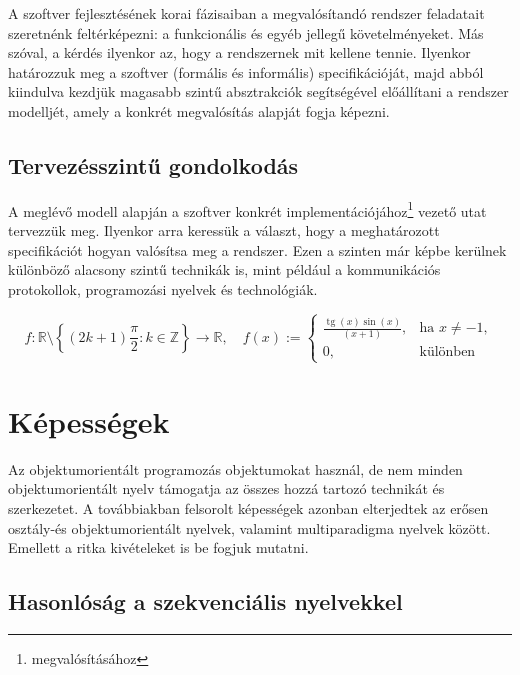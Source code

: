 \documentclass[a4paper,12pt,twoside]{report}
\theoremstyle{definition}
\DeclareMathOperator{\tg}{tg}
\begin{document}
	A szoftver fejlesztésének korai fázisaiban a megvalósítandó rendszer feladatait szeretnénk feltérképezni: a funkcionális és egyéb jellegű követelményeket. Más szóval, a kérdés ilyenkor az, hogy a rendszernek mit kellene tennie. Ilyenkor határozzuk meg a szoftver (formális és informális) specifikációját, majd abból kiindulva kezdjük magasabb szintű absztrakciók segítségével előállítani a rendszer modelljét, amely a konkrét megvalósítás alapját fogja képezni.
	
	\section{Tervezésszintű gondolkodás}
	
	A meglévő modell alapján a szoftver konkrét implementációjához\footnote{megvalósításához} vezető utat tervezzük meg. Ilyenkor arra keressük a választ, hogy a meghatározott specifikációt hogyan valósítsa meg a rendszer. Ezen a szinten már képbe kerülnek különböző alacsony szintű technikák is, mint például a kommunikációs protokollok, programozási nyelvek és technológiák.
	
	\begin{equation}\label{egyenlet}
		f\colon\mathbb{R}\setminus\left\{(2k+1)\frac{\pi}{2}:k\in\mathbb{Z}\right\}
		\to\mathbb{R},\quad f(x):=
		\begin{cases}
			\frac{\tg(x)\sin(x)}{(x+1)},&\text{ha }x\not=-1,\\
			0,&\text{különben}
		\end{cases}
	\end{equation}

	\chapter{Képességek}\label{fejezet-kep}
	
	Az objektumorientált programozás objektumokat használ, de nem minden objektumorientált nyelv támogatja az összes hozzá tartozó technikát és szerkezetet. A továbbiakban felsorolt képességek azonban elterjedtek az erősen osztály-és objektumorientált nyelvek, valamint multiparadigma nyelvek között. Emellett a ritka kivételeket is be fogjuk mutatni.
	
	\section{Hasonlóság a szekvenciális nyelvekkel}
	
\end{document}
